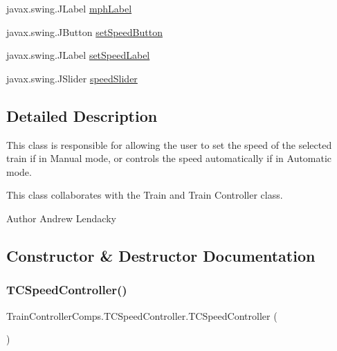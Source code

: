 \begin{DoxyCompactItemize}
\item 
javax.\+swing.\+J\+Label \hyperlink{classTrainControllerComps_1_1TCSpeedController_a681d1c2c9079a1207d4360cf37da07af}{mph\+Label}
\item 
javax.\+swing.\+J\+Button \hyperlink{classTrainControllerComps_1_1TCSpeedController_ab120f3835e3e8c45f84377cdd92f35c1}{set\+Speed\+Button}
\item 
javax.\+swing.\+J\+Label \hyperlink{classTrainControllerComps_1_1TCSpeedController_ad089c32c9a1548349c55c3468a97848d}{set\+Speed\+Label}
\item 
javax.\+swing.\+J\+Slider \hyperlink{classTrainControllerComps_1_1TCSpeedController_ac4869ca6b35dbfb1c44385205c2d13c5}{speed\+Slider}
\end{DoxyCompactItemize}


\subsection{Detailed Description}
This class is responsible for allowing the user to set the speed of the selected train if in Manual mode, or controls the speed automatically if in Automatic mode. 

This class collaborates with the Train and Train Controller class.

\begin{DoxyAuthor}{Author}
Andrew Lendacky 
\end{DoxyAuthor}


\subsection{Constructor \& Destructor Documentation}
\mbox{\label{classTrainControllerComps_1_1TCSpeedController_a2bf8141c881ab8a26b084813be33a200}} 
\subsubsection{\texorpdfstring{T\+C\+Speed\+Controller()}{TCSpeedController()}}
{\footnotesize\ttfamily Train\+Controller\+Comps.\+T\+C\+Speed\+Controller.\+T\+C\+Speed\+Controller (\begin{DoxyParamCaption}{ }\end{DoxyParamCaption})}



